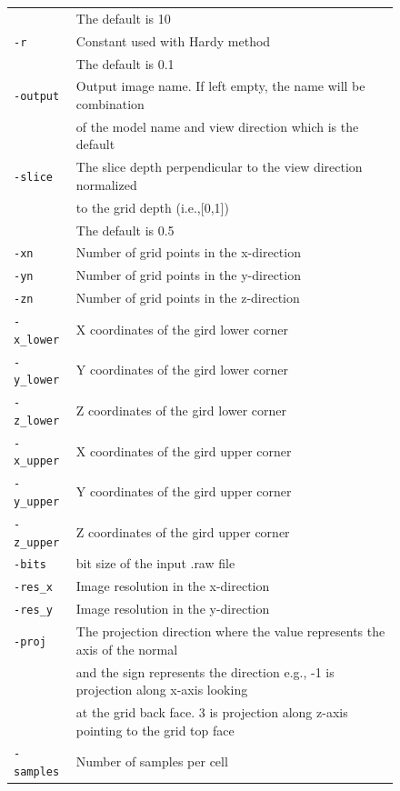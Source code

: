\documentclass[12pt]{article}
\begin{document}
\begin{figure}
\begin{tabular}{ |l| l|}
                      & The default is 10\\
  \texttt{-r}         & Constant used with Hardy method \\
                      & The default is 0.1\\  				      
  \texttt{-output}    & Output image name. If left empty, the name will be combination \\
  				      & of the model name and view direction which is the default\\
  \texttt{-slice}     & The slice depth perpendicular to the view direction normalized \\
                      & to the grid depth (i.e.,[0,1]) \\
  				      & The default is 0.5\\  
  \texttt{-xn}        & Number of grid points in the x-direction \\
  \texttt{-yn}        & Number of grid points in the y-direction \\
  \texttt{-zn}        & Number of grid points in the z-direction \\
  \texttt{-x\_lower}  & X coordinates of the gird lower corner \\
  \texttt{-y\_lower}  & Y coordinates of the gird lower corner \\
  \texttt{-z\_lower}  & Z coordinates of the gird lower corner \\
  \texttt{-x\_upper}  & X coordinates of the gird upper corner \\  
  \texttt{-y\_upper}  & Y coordinates of the gird upper corner \\  
  \texttt{-z\_upper}  & Z coordinates of the gird upper corner \\  
  \texttt{-bits}      & bit size of the input .raw file \\   
  \texttt{-res\_x}    & Image resolution in the x-direction \\      
  \texttt{-res\_y}    & Image resolution in the y-direction \\      
  \texttt{-proj}      & The projection direction where the value represents the axis of the normal\\  
			          & and the sign represents the direction e.g., -1 is projection along x-axis looking\\
			          & at the grid back face. 3 is projection along z-axis pointing to the grid top face\\      
  \texttt{-samples}   & Number of samples per cell \\      
    
  \hline
\end{tabular}    
\end{figure} 
	    
\end{document}
